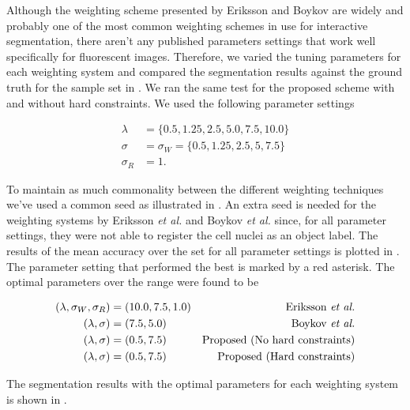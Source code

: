 Although the weighting scheme presented by Eriksson \citep{Eriksson2006} and Boykov \citep{Boykov2001_2} are widely and probably one of the most common weighting schemes in use for interactive segmentation, there aren't any published parameters settings that work well specifically for fluorescent images. Therefore, we varied the tuning parameters for each weighting system and compared the segmentation results against the ground truth for the sample set in . We ran the same test for the proposed scheme with and without hard constraints. We used the following parameter settings

\begin{align*}
	\lambda & = \{ 0.5, 1.25, 2.5, 5.0, 7.5, 10.0 \}\\
	\sigma & = \sigma_W = \{ 0.5, 1.25, 2.5, 5, 7.5 \}\\
	\sigma_R & = 1.
\end{align*}

To maintain as much commonality between the different weighting techniques we've used a common seed as illustrated in . An extra seed is needed for the weighting systems by Eriksson \textit{et al.} and Boykov \textit{et al.} since, for all parameter settings, they were not able to register the cell nuclei as an object label. The results of the mean accuracy over the set for all parameter settings is plotted in . The parameter setting that performed the best is marked by a red asterisk. The optimal parameters over the range were found to be 

\begin{align*}
	( \lambda, \sigma_W, \sigma_R ) &= (10.0, 7.5, 1.0) & \text{Eriksson \textit{et al.}}\\
	( \lambda, \sigma) &= (7.5, 5.0) & \text{Boykov \textit{et al.}}\\
	( \lambda, \sigma) &= (0.5, 7.5) & \text{Proposed (No hard constraints)}\\
	( \lambda, \sigma) &= (0.5, 7.5) & \text{Proposed (Hard constraints)}
\end{align*}

The segmentation results with the optimal parameters for each weighting system is shown in .

